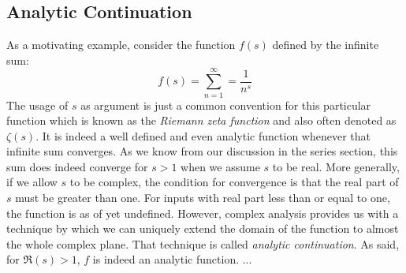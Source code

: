 \subsection{Analytic Continuation}
As a motivating example, consider the function $f(s)$ defined by the infinite sum:
\begin{equation}
f(s) = \sum_{n=1}^{\infty} = \frac{1}{n^s}
\end{equation}
The usage of $s$ as argument is just a common convention for this particular function which is known as the \emph{Riemann zeta function} and also often denoted as $\zeta (s)$. It is indeed a well defined and even analytic function whenever that infinite sum converges. As we know from our discussion in the series section, this sum does indeed converge for $s > 1$ when we assume $s$ to be real. More generally, if we allow $s$ to be complex, the condition for convergence is that the real part of $s$ must be greater than one. For inputs with real part less than or equal to one, the function is as of yet undefined. However, complex analysis provides us with a technique by which we can uniquely extend the domain of the function to almost the whole complex plane. That technique is called \emph{analytic continuation}. As said, for $\Re(s) > 1$, $f$ is indeed an analytic function. ...











